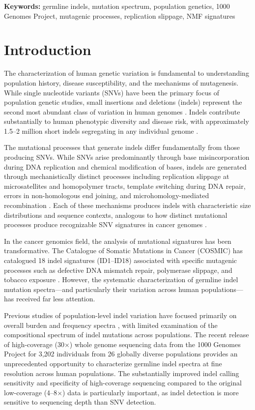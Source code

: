 \documentclass[11pt,a4paper]{article}
\begin{document}
\textbf{Keywords:} germline indels, mutation spectrum, population genetics, 1000 Genomes Project, mutagenic processes, replication slippage, NMF signatures

\section{Introduction}

The characterization of human genetic variation is fundamental to understanding population history, disease susceptibility, and the mechanisms of mutagenesis. While single nucleotide variants (SNVs) have been the primary focus of population genetic studies, small insertions and deletions (indels) represent the second most abundant class of variation in human genomes \citep{1000genomes2015,byrska2022high}. Indels contribute substantially to human phenotypic diversity and disease risk, with approximately 1.5--2 million short indels segregating in any individual genome \citep{mullaney2010small,montgomery2013mutation}.

The mutational processes that generate indels differ fundamentally from those producing SNVs. While SNVs arise predominantly through base misincorporation during DNA replication and chemical modification of bases, indels are generated through mechanistically distinct processes including replication slippage at microsatellites and homopolymer tracts, template switching during DNA repair, errors in non-homologous end joining, and microhomology-mediated recombination \citep{levinson1987slipped,pearson2005repeat,chuzhanova2003meta}. Each of these mechanisms produces indels with characteristic size distributions and sequence contexts, analogous to how distinct mutational processes produce recognizable SNV signatures in cancer genomes \citep{alexandrov2013signatures,alexandrov2020repertoire}.

In the cancer genomics field, the analysis of mutational signatures has been transformative. The Catalogue of Somatic Mutations in Cancer (COSMIC) has catalogued 18 indel signatures (ID1--ID18) associated with specific mutagenic processes such as defective DNA mismatch repair, polymerase slippage, and tobacco exposure \citep{alexandrov2020repertoire}. However, the systematic characterization of germline indel mutation spectra---and particularly their variation across human populations---has received far less attention.

Previous studies of population-level indel variation have focused primarily on overall burden and frequency spectra \citep{1000genomes2015,mills2011natural}, with limited examination of the compositional spectrum of indel mutations across populations. The recent release of high-coverage (30$\times$) whole genome sequencing data from the 1000 Genomes Project for 3,202 individuals from 26 globally diverse populations \citep{byrska2022high} provides an unprecedented opportunity to characterize germline indel spectra at fine resolution across human populations. The substantially improved indel calling sensitivity and specificity of high-coverage sequencing compared to the original low-coverage (4--8$\times$) data \citep{byrska2022high} is particularly important, as indel detection is more sensitive to sequencing depth than SNV detection.
\end{document}
